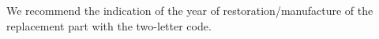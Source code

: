 \documentclass[12pt]{article}
\begin{document}
We recommend the indication of the year of restoration/manufacture of the replacement part with the two-letter code.


\newpage
  
\end{document}
